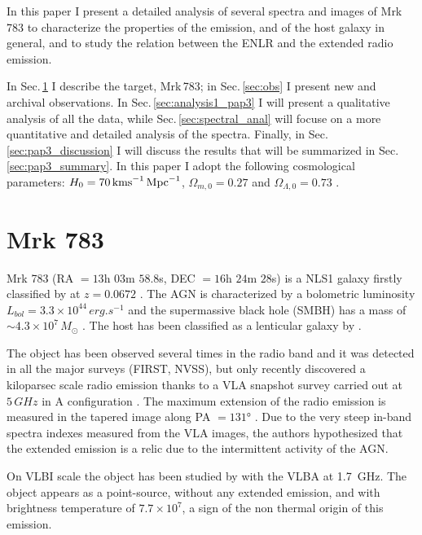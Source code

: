 \documentclass[../thesis.tex]{subfiles}
\begin{document}
In this paper I present a detailed analysis of several spectra and images of Mrk\,783 to characterize the properties of the emission, and of the host galaxy in general, and to study the relation between the ENLR and the extended radio emission.

In Sec.\,\ref{sec:pap3_mrk783} I describe the target, Mrk\,783; in Sec.\,\ref{sec:obs} I present new and archival observations.
In Sec.\,\ref{sec:analysis1_pap3} I will present a qualitative analysis of all the data, while Sec.\,\ref{sec:spectral_anal} will focuse on a more quantitative and detailed analysis of the spectra.
Finally, in Sec.\,\ref{sec:pap3_discussion} I will discuss the results that will be summarized in Sec.\,\ref{sec:pap3_summary}.
In this paper I adopt the following cosmological parameters: $H_0 = 70\,\si{\kms.Mpc^{-1}}$, $\Omega_{m,0} = 0.27$ and $\Omega_{\Lambda,0} = 0.73$ \citep{Komatsu11}.

\section{Mrk 783}
\label{sec:pap3_mrk783}

Mrk 783 (RA $= 13$h $03$m $58.8$s, DEC $=16$h $24$m $28$s) is a NLS1 galaxy firstly classified by \citet{Osterbrock85} at $z = 0.0672$ \citep{Hewitt91}.
The AGN is characterized by a bolometric luminosity $L_{bol} = 3.3\times 10^{44}\,\si{erg.s^{-1}}$ and the supermassive black hole (SMBH) has a mass of $\sim 4.3\times10^{7}\,\si{M_{\odot}}$ \citep{Berton15a}.
The host has been classified as a lenticular galaxy by \citet{Petrosian07}.

The object has been observed several times in the radio band and it was detected in all the major surveys (FIRST, NVSS), but only recently \citet{Congiu17} discovered a kiloparsec scale radio emission thanks to a VLA snapshot survey carried out at $5\,\si{GHz}$ in A configuration \citep{Berton18}.
The maximum extension of the radio emission is measured in the tapered image along PA $= \ang{131}$ \citep[$14$ kpc][]{Congiu17}.
Due to the very steep in-band spectra indexes measured from the VLA images, the authors hypothesized that the extended emission is a relic due to the intermittent activity of the AGN.

On VLBI scale the object has been studied by \citet{Doi13} with the VLBA at \SI{1.7}{GHz}.
The object appears as a point-source, without any extended emission, and with brightness temperature of $7.7\times10^7$, a sign of the non thermal origin of this emission.
\end{document}
